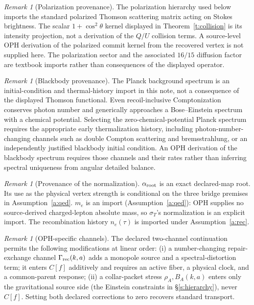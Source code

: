 \documentclass[11pt]{article}
\theoremstyle{remark}
\newtheorem{remark}[theorem]{Remark}
\begin{document}
\begin{remark}[Polarization provenance]
The polarization hierarchy used below imports the standard polarized
Thomson scattering matrix acting on Stokes brightness.  The scalar
$1+\cos^2\theta$ kernel displayed in Theorem~\ref{t:collision} is its
intensity projection, not a derivation of the $Q/U$ collision terms.  A
source-level OPH derivation of the polarized commit kernel from the recovered
vertex is not supplied here. The polarization sector and the associated $16/15$
diffusion factor are textbook imports rather than consequences of the displayed
operator.
\end{remark}

\begin{remark}[Blackbody provenance]
The Planck background spectrum is an initial-condition and thermal-history
import in this note, not a consequence of the displayed Thomson functional.
Even recoil-inclusive Comptonization conserves photon number and generically
approaches a Bose--Einstein spectrum with a chemical potential. Selecting
the zero-chemical-potential Planck spectrum requires the appropriate early
thermalization history, including photon-number-changing channels such as
double Compton scattering and bremsstrahlung, or an independently justified
blackbody initial condition. An OPH derivation of the blackbody spectrum
requires those channels and their rates rather than inferring
spectral uniqueness from angular detailed balance.
\end{remark}

\begin{remark}[Provenance of the normalization]
$\alpha_{\rm root}$ is an exact declared-map root. Its use as the physical
vertex strength is conditional on the three bridge premises in
Assumption~\ref{a:qed}. $m_e$ is an import
(Assumption~\ref{a:qed}): OPH supplies no source-derived charged-lepton
absolute mass, so $\sigma_T$'s normalization is
an explicit import. The recombination history $n_e(\tau)$ is imported under
Assumption~\ref{a:rec}.
\end{remark}

\begin{remark}[OPH-specific channels]\label{r:channels}
The declared two-channel continuation permits the following modifications
at linear order:
(i) a number-changing repair-exchange channel $\Gamma_{\rm rec}(k,a)$ adds a
monopole source and a spectral-distortion term; it enters $C[f]$
additively and requires an active fiber, a physical clock, and a
common-parent response;
(ii) a collar-packet stress $\rho_A,B_A(k,a)$ enters only the gravitational
source side (the Einstein constraints in \S\ref{s:hierarchy}), never $C[f]$.
Setting both declared corrections to zero recovers standard transport.
\end{remark}
\end{document}
